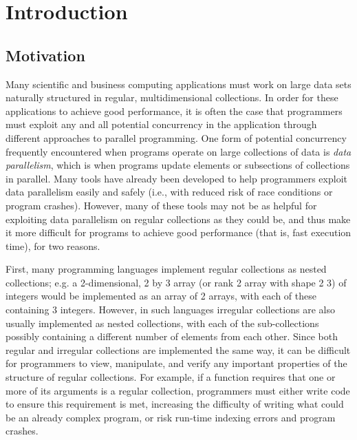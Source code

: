 \chapter{Introduction}

\section{Motivation}
Many scientific and business computing applications must work on large data sets 
naturally structured in regular, multidimensional collections.
In order for these applications to achieve good performance, 
it is often the case that programmers must exploit any and all potential concurrency in the application 
through different approaches to parallel programming.
One form of potential concurrency frequently encountered when programs operate on large collections of data 
is \textit{data parallelism}, which is when programs update elements or subsections of collections in parallel.
Many tools have already been developed to help programmers exploit data parallelism 
easily and safely (i.e., with reduced risk of race conditions or program crashes)\cite{dph}\cite{openmp}. 
However, many of these tools may not be as helpful 
for exploiting data parallelism on regular collections as they could be, 
and thus make it more difficult for programs 
to achieve good performance (that is, fast execution time), for two reasons.

First, many programming languages implement regular collections as nested collections;
e.g. a 2-dimensional, 2 by 3 array (or rank 2 array with shape 2 3) of integers would be implemented as 
an array of 2 arrays, with each of these containing 3 integers. 
However, in such languages irregular collections are also usually implemented as nested collections, 
with each of the sub-collections possibly containing a different number of elements from each other.
Since both regular and irregular collections are implemented the same way,
it can be difficult for programmers to view, manipulate, and verify 
any important properties of the structure of regular collections.
For example, if a function requires that one or more of its arguments is a regular collection, 
programmers must either write code to ensure this requirement is met,
increasing the difficulty of writing what could be an already complex program, 
or risk run-time indexing errors and program crashes.

